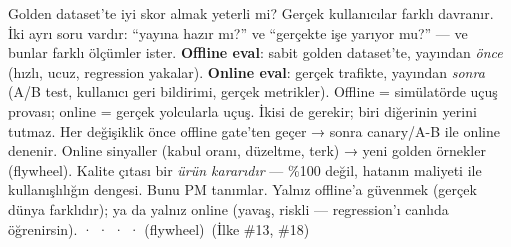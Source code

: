 
 Golden dataset'te iyi skor almak yeterli mi? Gerçek kullanıcılar
farklı davranır. İki ayrı soru vardır: ``yayına hazır mı?'' ve ``gerçekte işe
yarıyor mu?'' --- ve bunlar farklı ölçümler ister.
 \textbf{Offline eval}: sabit golden dataset'te, yayından \emph{önce}
(hızlı, ucuz, regression yakalar). \textbf{Online eval}: gerçek trafikte, yayından
\emph{sonra} (A/B test, kullanıcı geri bildirimi, gerçek metrikler).
 Offline = simülatörde uçuş provası; online = gerçek yolcularla uçuş.
İkisi de gerekir; biri diğerinin yerini tutmaz.
 Her değişiklik önce offline gate'ten geçer → sonra canary/A-B ile online
denenir. Online sinyaller (kabul oranı, düzeltme, terk) → yeni golden örnekler (flywheel).
 Kalite çıtası bir \emph{ürün kararıdır} --- \%100 değil,
hatanın maliyeti ile kullanışlılığın dengesi. Bunu PM tanımlar.
 Yalnız offline'a güvenmek (gerçek dünya farklıdır); ya da yalnız online
(yavaş, riskli --- regression'ı canlıda öğrenirsin).
  ·  ·  ·  ·  (flywheel) \,{\scriptsize\color{softgray}(İlke \#13, \#18)}
